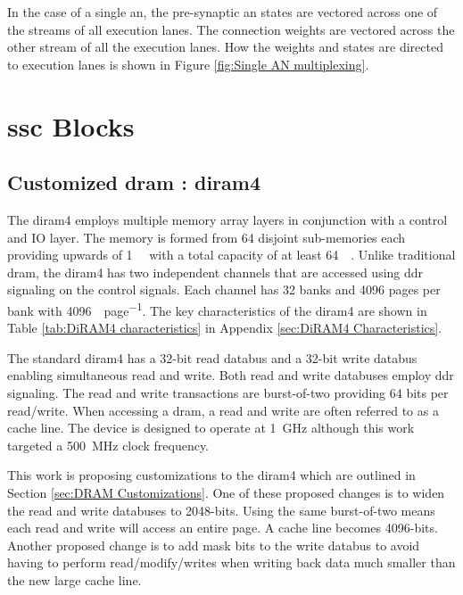 In the case of a single \ac{an}, the pre-synaptic \ac{an} states are vectored across one of the streams of all execution lanes.
The connection weights are vectored across the other stream of all the execution lanes.
How the weights and states are directed to execution lanes is shown in Figure \ref{fig:Single AN multiplexing}.


\section{\acf{ssc} Blocks}
\label{sec:SSC Blocks}

\subsection{Customized \ac{dram} : \acf{diram4}}
\label{sec:3ddram}
The \ac{diram4} \cite{tezzaron:diram4} employs multiple memory array layers in conjunction with a control and IO layer.
The memory is formed from 64 disjoint sub-memories each providing upwards of \SI[per-mode=symbol]{1}{\giga\bit} with a total capacity of at least \SI[per-mode=symbol]{64}{\giga\bit}.
Unlike traditional \ac{dram}, the \ac{diram4} has two independent channels that are accessed using \ac{ddr} signaling on the control signals.
Each channel has 32 banks and 4096 pages per bank with \SI[per-mode=symbol]{4096}{\bit\per page}.
The key characteristics of the \ac{diram4} are shown in Table \ref{tab:DiRAM4 characteristics} in Appendix \ref{sec:DiRAM4 Characteristics}. 

The standard \ac{diram4} has a 32-bit read databus and a 32-bit write databus enabling simultaneous read and write. Both read and write databuses employ \ac{ddr} signaling.
The read and write transactions are burst-of-two providing 64 bits per read/write. When accessing a \ac{dram}, a read and write are often referred to as a cache line.
The device is designed to operate at \SI[per-mode=symbol]{1}{\giga\hertz} although this work targeted a \SI[per-mode=symbol]{500}{\mega\hertz} clock frequency.

This work is proposing customizations to the \ac{diram4} which are outlined in Section \ref{sec:DRAM Customizations}. One of these proposed changes is to widen the read and write databuses to 2048-bits.
Using the same burst-of-two means each read and write will access an entire page. A cache line becomes 4096-bits.
Another proposed change is to add mask bits to the write databus to avoid having to perform read/modify/writes when writing back data much smaller than the new large cache line.

